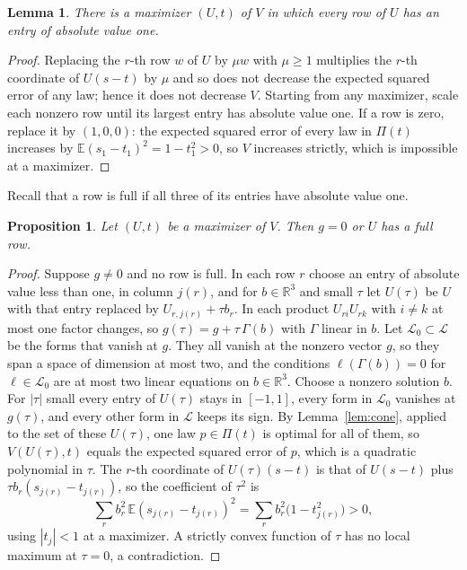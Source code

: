 \documentclass[11pt]{amsart}
\newtheorem{lem}[thm]{Lemma}
\newtheorem{prop}[thm]{Proposition}
\theoremstyle{remark}
\numberwithin{equation}{section}
\newcommand{\E}{\mathbb E}
\begin{document}
\begin{lem}\label{lem:rows}
There is a maximizer $(U,t)$ of $V$ in which every row of $U$ has an entry of absolute value one.
\end{lem}

\begin{proof}
Replacing the $r$-th row $w$ of $U$ by $\mu w$ with $\mu\ge1$ multiplies the $r$-th coordinate of $U(s-t)$ by $\mu$ and so does not decrease the expected squared error of any law; hence it does not decrease $V$. Starting from any maximizer, scale each nonzero row until its largest entry has absolute value one. If a row is zero, replace it by $(1,0,0)$: the expected squared error of every law in $\Pi(t)$ increases by $\E(s_1-t_1)^2=1-t_1^2>0$, so $V$ increases strictly, which is impossible at a maximizer.
\end{proof}

Recall that a row is full if all three of its entries have absolute value one.

\begin{prop}\label{prop:dichotomy}
Let $(U,t)$ be a maximizer of $V$. Then $g=0$ or $U$ has a full row.
\end{prop}

\begin{proof}
Suppose $g\ne0$ and no row is full. In each row $r$ choose an entry of absolute value less than one, in column $j(r)$, and for $b\in\mathbb R^3$ and small $\tau$ let $U(\tau)$ be $U$ with that entry replaced by $U_{r,j(r)}+\tau b_r$. In each product $U_{ri}U_{rk}$ with $i\ne k$ at most one factor changes, so $g(\tau)=g+\tau\,\Gamma(b)$ with $\Gamma$ linear in $b$. Let $\mathcal L_0\subset\mathcal L$ be the forms that vanish at $g$. They all vanish at the nonzero vector $g$, so they span a space of dimension at most two, and the conditions $\ell(\Gamma(b))=0$ for $\ell\in\mathcal L_0$ are at most two linear equations on $b\in\mathbb R^3$. Choose a nonzero solution $b$. For $|\tau|$ small every entry of $U(\tau)$ stays in $[-1,1]$, every form in $\mathcal L_0$ vanishes at $g(\tau)$, and every other form in $\mathcal L$ keeps its sign. By Lemma~\ref{lem:cone}, applied to the set of these $U(\tau)$, one law $p\in\Pi(t)$ is optimal for all of them, so $V(U(\tau),t)$ equals the expected squared error of $p$, which is a quadratic polynomial in $\tau$. The $r$-th coordinate of $U(\tau)(s-t)$ is that of $U(s-t)$ plus $\tau b_r(s_{j(r)}-t_{j(r)})$, so the coefficient of $\tau^2$ is
\[
\sum_rb_r^2\,\E(s_{j(r)}-t_{j(r)})^2=\sum_rb_r^2\bigl(1-t_{j(r)}^2\bigr)>0,
\]
using $|t_j|<1$ at a maximizer. A strictly convex function of $\tau$ has no local maximum at $\tau=0$, a contradiction.
\end{proof}
\end{document}
